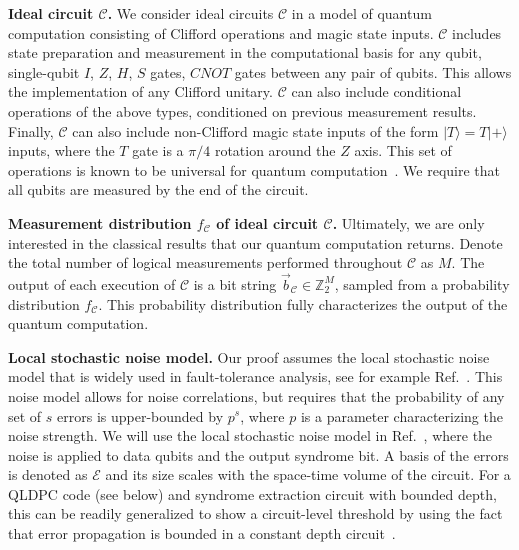 \textbf{Ideal circuit $\mathcal{C}$.}
%
We consider ideal circuits $\mathcal{C}$ in a model of quantum computation consisting of Clifford operations and magic state inputs.
%
$\mathcal{C}$ includes state preparation and measurement in the computational basis for any qubit, single-qubit $I$, $Z$, $H$, $S$ gates, $CNOT$ gates between any pair of qubits.
%
This allows the implementation of any Clifford unitary.
%
$\mathcal{C}$ can also include conditional operations of the above types, conditioned on previous measurement results.
%
Finally, $\mathcal{C}$ can also include non-Clifford magic state inputs of the form $|T\rangle=T|+\rangle$ inputs, where the $T$ gate is a $\pi/4$ rotation around the $Z$ axis.
%
This set of operations is known to be universal for quantum computation~\cite{nielsen2010quantum}.
%
We require that all qubits are measured by the end of the circuit.

\textbf{Measurement distribution $f_{\mathcal{C}}$ of ideal circuit $\mathcal{C}$.}
%
Ultimately, we are only interested in the classical results that our quantum computation returns.
%
Denote the total number of logical measurements performed throughout $\mathcal{C}$ as $M$.
%
The output of each execution of $\mathcal{C}$ is a bit string $\vec{b}_{\mathcal{C}}\in \mathbb{Z}_2^M$, sampled from a probability distribution $f_\mathcal{C}$.
%
This probability distribution fully characterizes the output of the quantum computation.

\textbf{Local stochastic noise model.} 
%
Our proof assumes the local stochastic noise model that is widely used in fault-tolerance analysis, see for example Ref.~\cite{gottesman2013fault}.
%
This noise model allows for noise correlations, but requires that the probability of any set of $s$ errors is upper-bounded by $p^s$, where $p$ is a parameter characterizing the noise strength.
%
We will use the local stochastic noise model in Ref.~\cite{gottesman2013fault,xu2024constant}, where the noise is applied to data qubits and the output syndrome bit.
%
A basis of the errors is denoted as $\mathcal{E}$ and its size scales with the space-time volume of the circuit.
%
For a QLDPC code (see below) and syndrome extraction circuit with bounded depth, this can be readily generalized to show a circuit-level threshold by using the fact that error propagation is bounded in a constant depth circuit~\cite{gottesman2013fault,pattison2025hierarchical,bravyi2020quantum}.

